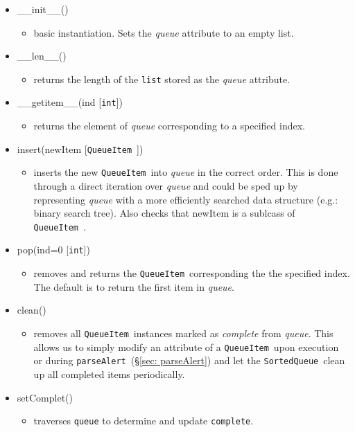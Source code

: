 \documentclass{article}
\newcommand{\parseAlert}{\texttt{parseAlert}~}
\newcommand{\SortedQueue}{\texttt{SortedQueue}~}
\newcommand{\QueueItem}{\texttt{QueueItem}~}
\begin{document}
\begin{itemize}
    \item{\_\_init\_\_()
        \begin{itemize}
            \item{basic instantiation. Sets the \textit{queue} attribute to an empty list.}
        \end{itemize}
         }
    \item{\_\_len\_\_()
        \begin{itemize}
            \item{returns the length of the \texttt{list} stored as the \textit{queue} attribute.}
        \end{itemize}
         }
    \item{\_\_getitem\_\_(ind [\texttt{int}])
        \begin{itemize}
            \item{returns the element of \textit{queue} corresponding to a specified index.}
        \end{itemize}
         }
    \item{insert(newItem [\QueueItem])
        \begin{itemize}
            \item{inserts the new \QueueItem into \textit{queue} in the correct order. This is done through a direct iteration over \textit{queue} and could be sped up by representing \textit{queue} with a more efficiently searched data structure (e.g.: binary search tree). Also checks that newItem is a sublcass of \QueueItem.}
        \end{itemize}
         }
    \item{pop(ind=0 [\texttt{int}])
        \begin{itemize}
            \item{removes and returns the \QueueItem corresponding the the specified index. The default is to return the first item in \textit{queue}.}
        \end{itemize}
         }
    \item{clean()
        \begin{itemize}
            \item{removes all \QueueItem instances marked as \textit{complete} from \textit{queue}. This allows us to simply modify an attribute of a \QueueItem upon execution or during \parseAlert (\S\ref{sec: parseAlert}) and let the \SortedQueue clean up all completed items periodically.}
        \end{itemize}
         }
    \item{setComplet()
        \begin{itemize}
            \item{traverses \texttt{queue} to determine and update \texttt{complete}.}
        \end{itemize}
         }
\end{itemize}
\end{document}
